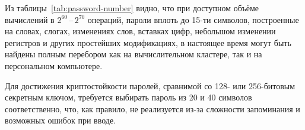 Из таблицы~\ref{tab:password-number} видно, что при доступном объёме вычислений в $2^{60}$\,--\,$2^{70}$ операций, пароли вплоть до 15-ти символов, построенные на словах, слогах, изменениях слов, вставках цифр, небольшом изменении регистров и других простейших модификациях, в настоящее время могут быть найдены полным перебором как на вычислительном кластере, так и на персональном компьютере.

Для достижения криптостойкости паролей, сравнимой со 128- или 256-битовым секретным ключом, требуется выбирать пароль из 20 и 40 символов соответственно, что, как правило, не реализуется из-за сложности запоминания и возможных ошибок при вводе.


%
